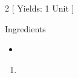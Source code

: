 \begin{Large}
    
\end{Large}

\begin{scriptsize}
\begin{multicols}{2}
[
\vspace{1em}
Yields: 1 Unit
\vspace{-1.5em}
]

Ingredients
\begin{itemize}
    \item 
\end{itemize}
\end{multicols}
\end{scriptsize}

\begin{footnotesize}
\begin{enumerate}
    \item 
\end{enumerate}
\end{footnotesize}

\vspace{2em}
